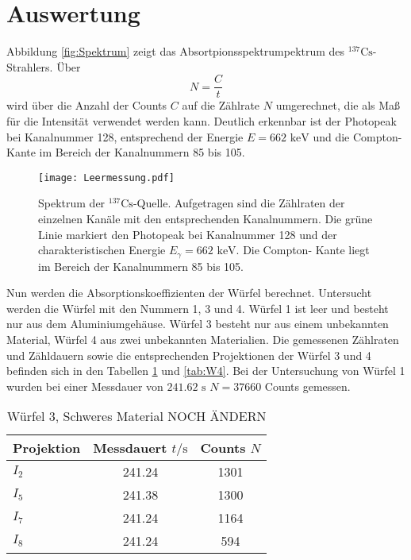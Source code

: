 \section{Auswertung}
Abbildung \ref{fig:Spektrum} zeigt das Absortpionsspektrumpektrum des ${}^{137}\text{Cs}$-Strahlers.
Über 
\begin{equation*}
    N = \frac{C}{t}
\end{equation*}
wird über die Anzahl der Counts $C$ auf die Zählrate $N$ umgerechnet, die als Maß für die Intensität
verwendet werden kann.
Deutlich erkennbar ist der Photopeak bei Kanalnummer 128, entsprechend der Energie $E= 662 \text{ keV}$ 
und die Compton-Kante im Bereich der Kanalnummern 85 bis 105. 
\begin{figure}
    \centering
    \texttt{[image: Leermessung.pdf]}
    \caption{Spektrum der ${}^{137}\text{Cs}$-Quelle. Aufgetragen sind die Zählraten der einzelnen
    Kanäle mit den entsprechenden Kanalnummern. Die grüne Linie markiert den Photopeak bei  
    Kanalnummer 128 und der charakteristischen Energie $E_\gamma = 662 \text{ keV}$. Die Compton-
    Kante liegt im Bereich der Kanalnummern 85 bis 105.}
    \label{fig:spektrum}
\end{figure}
Nun werden die Absorptionskoeffizienten der Würfel berechnet. Untersucht
werden die Würfel mit den Nummern 1, 3 und 4. Würfel 1 ist leer und besteht nur aus dem Aluminiumgehäuse.
Würfel 3 besteht nur aus einem unbekannten Material, Würfel 4 aus zwei unbekannten Materialien. 
Die gemessenen Zählraten und Zähldauern sowie die entsprechenden Projektionen der Würfel 3 und 4 
befinden sich in den Tabellen \ref{tab:W3} und \ref{tab:W4}. 
Bei der Untersuchung von Würfel 1 wurden bei einer Messdauer von $241.62 \text{ s}$ $N = 37660$ Counts
gemessen.
\FloatBarrier
\begin{table}[h]
    \centering
    \caption{Würfel 3, Schweres Material NOCH ÄNDERN}
    \label{tab:W3}
    \begin{tabular}{l c c}
        \toprule
        {Projektion} & {Messdauert $t/\si{\s}$} & {Counts $N$}\\
        \midrule
        $I_2$ & 241.24 & 1301 \\
        $I_5$ & 241.38 & 1300 \\
        $I_7$ & 241.24 & 1164 \\
        $I_8$ & 241.24 & 594 \\
        \bottomrule
    \end{tabular}
\end{table}
